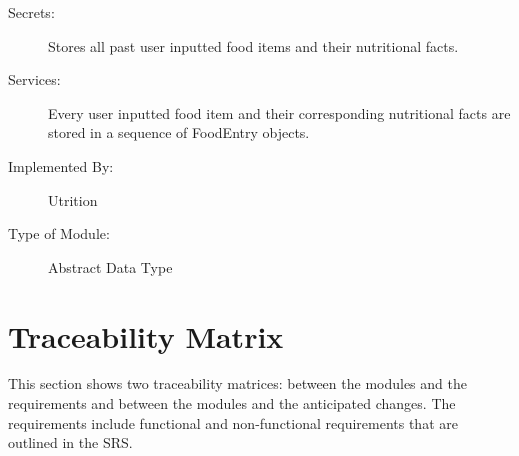\documentclass[12pt, titlepage]{article}
\begin{document}
\begin{description}
	\item[Secrets:]Stores all past user inputted food items and their 
	nutritional facts.
	\item[Services:]Every user inputted food item and their corresponding 
	nutritional facts are stored in a sequence of FoodEntry objects.
	\item[Implemented By:] Utrition
	\item[Type of Module:] Abstract Data Type
\end{description}

\section{Traceability Matrix} \label{SecTM}

This section shows two traceability matrices: between the modules and the
requirements and between the modules and the anticipated changes. The requirements include functional and non-functional requirements that are outlined in the SRS.
\end{document}
